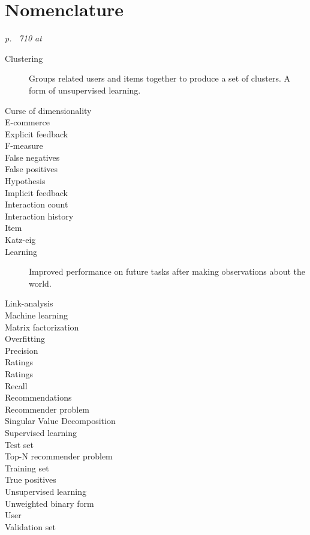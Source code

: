 \chapter{Nomenclature}\label{cha:def}

\textit{p. ~710 at \citep{norvigAI}}

\begin{description}
    \item[Clustering] Groups related users and items together to produce a set of clusters. A form of unsupervised learning.
    \item[Curse of dimensionality]
    \item[E-commerce]
    \item[Explicit feedback]
    \item[F-measure]
    \item[False negatives]
    \item[False positives]
    \item[Hypothesis]
    \item[Implicit feedback]
    \item[Interaction count]
    \item[Interaction history]
    \item[Item]
    \item[Katz-eig]
    \item[Learning] Improved performance on future tasks after making observations about the world.
    \item[Link-analysis]
    \item[Machine learning]
    \item[Matrix factorization]
    \item[Overfitting]
    \item[Precision]
    \item[Ratings]
    \item[Ratings]
    \item[Recall]
    \item[Recommendations]
    \item[Recommender problem]
    \item[Singular Value Decomposition]
    \item[Supervised learning]
    \item[Test set]
    \item[Top-N recommender problem]
    \item[Training set]
    \item[True positives]
    \item[Unsupervised learning]
    \item[Unweighted binary form]
    \item[User]
    \item[Validation set]
\end{description}

